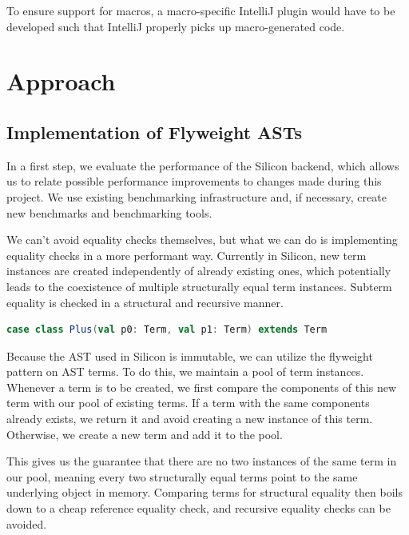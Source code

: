 \documentclass[11pt]{article}
\begin{document}
    To ensure support for macros, a macro-specific IntelliJ plugin would have to be developed such that
    IntelliJ properly picks up macro-generated code.

    \section{Approach} \label{approach}

    \subsection{Implementation of Flyweight ASTs} \label{approach:flyweight}

    In a first step, we evaluate the performance of the Silicon backend,
    which allows us to relate possible performance improvements to 
    changes made during this project. We use existing benchmarking infrastructure 
    and, if necessary, create new benchmarks and benchmarking tools.

    We can't avoid equality checks themselves, but what we can do is implementing
    equality checks in a more performant way. Currently in Silicon, new term instances are
    created independently of already existing ones, which potentially leads 
    to the coexistence of multiple structurally equal term instances. Subterm equality is checked in a
    structural and recursive manner.

    \begin{lstlisting}[language=Scala, caption={Simplification of how term instances currently are
    implemented. Because \texttt{Plus} is defined as a case class, the compiler automatically
    generates code for recursive structural equality checking.}]
case class Plus(val p0: Term, val p1: Term) extends Term
    \end{lstlisting}
        
    Because the AST used in Silicon is immutable, we can utilize the flyweight pattern \cite{patterns} on AST terms.
    To do this, we maintain a pool of term instances. Whenever a term
    is to be created, we first compare the components of this new term with our
    pool of existing terms. If a term with the same components already exists, we return it and
    avoid creating a new instance of this term. Otherwise, we create a new term and add it to
    the pool.

    This gives us the guarantee that there are no two instances of the
    same term in our pool, meaning every two structurally equal terms point to the same
    underlying object in memory. Comparing terms for structural equality then boils
    down to a cheap reference equality check, and recursive equality checks can be avoided.
    
\end{document}
